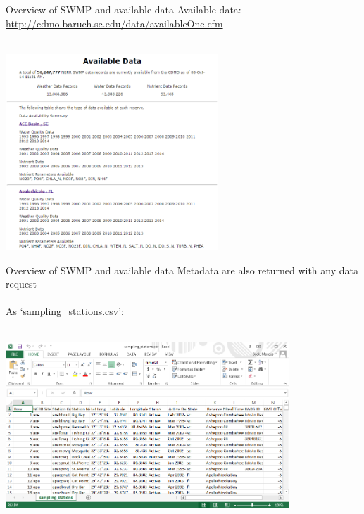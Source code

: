 \documentclass[xcolor=svgnames]{beamer}\usepackage[]{graphicx}\usepackage[]{color}
\begin{document}
\begin{frame}[t]{Overview of SWMP and available data}
Available data: \href{http://cdmo.baruch.sc.edu/data/availableOne.cfm}{http://cdmo.baruch.sc.edu/data/availableOne.cfm}\\~\\
\centerline{\includegraphics[width = 0.6\textwidth]{avail_dat.png}}
\end{frame}

\begin{frame}[t]{Overview of SWMP and available data}
Metadata are also returned with any data request\\~\\
As `sampling\_stations.csv':\\~\\
\centerline{\includegraphics[width = 0.8\textwidth]{samp_stat.png}}
\end{frame}
\end{document}
